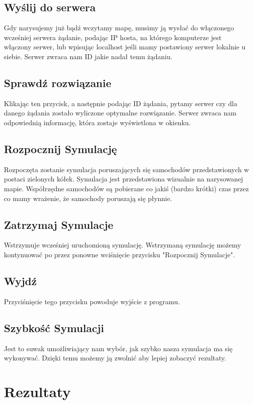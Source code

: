 \documentclass{article}
\begin{document}
\subsection{Wyślij do serwera}
    Gdy narysujemy już bądź wczytamy mapę, musimy ją wysłać do włączonego wcześniej serwera żądanie, podając IP hosta, na którego komputerze jest włączony serwer, lub wpisując localhost jeśli mamy postawiony serwer lokalnie u siebie. Serwer zwraca nam ID jakie nadał temu żądaniu.

\subsection{Sprawdź rozwiązanie}
    Klikając ten przycisk, a następnie podając ID żądania, pytamy serwer czy dla danego żądania zostało wyliczone optymalne rozwiązanie. Serwer zwraca nam odpowiednią informację, która zostaje wyświetlona w okienku.

\subsection{Rozpocznij Symulację}
    Rozpoczęta zostanie symulacja poruszających się samochodów przedstawionych w postaci zielonych kółek. Symulacja jest przedstawiona wizualnie na narysowanej mapie. Współrzędne samochodów są pobierane co jakiś (bardzo krótki) czas przez co mamy wrażenie, że samochody poruszają się płynnie.

\subsection{Zatrzymaj Symulacje}
    Wstrzymuje wcześniej uruchomioną symulację. Wstrzymaną symulację możemy kontynuować po przez ponowne wciśnięcie przycisku "Rozpocznij Symulacje".

\subsection{Wyjdź}
    Przyciśnięcie tego przycisku powoduje wyjście z programu.

\subsection{Szybkość Symulacji}
    Jest to suwak umożliwiający nam wybór, jak szybko nasza symulacja ma się wykonywać. Dzięki temu możemy ją zwolnić aby lepiej zobaczyć rezultaty.

\section{Rezultaty}
\end{document}
